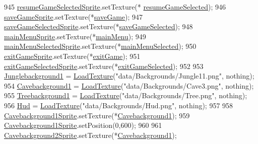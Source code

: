 \begin{DoxyCode}
945     \hyperlink{classTestApp_ab648e1b4ef3f657ca152176709c17ccc}{resumeGameSelectedSprite}.setTexture(*
      \hyperlink{classTestApp_a8caa47ef20c8711b1b89c9b82ab1202e}{resumeGameSelected});
946     \hyperlink{classTestApp_ac41e21b394f9e3e448503aa4afecf169}{saveGameSprite}.setTexture(*\hyperlink{classTestApp_ae1bdaf3470ac78c1df4907259b65c704}{saveGame});
947     \hyperlink{classTestApp_ae592b3a36dff7a6a45b669a65e5862fb}{saveGameSelectedSprite}.setTexture(*\hyperlink{classTestApp_a26f64bc9c07efe6d1be394e42a2bcc65}{saveGameSelected});
948     \hyperlink{classTestApp_a052722ceb28f1f2158513869d135057e}{mainMenuSprite}.setTexture(*\hyperlink{classTestApp_a8311b4b23d548074865fbcaed3acba40}{mainMenu});
949     \hyperlink{classTestApp_a095a03ff9f6700d21532beac758c27d3}{mainMenuSelectedSprite}.setTexture(*\hyperlink{classTestApp_ad6f809036a4aaf082211873d289b9f24}{mainMenuSelected});
950     \hyperlink{classTestApp_a55bf93b6dbf3838aacc67f652a3ff48d}{exitGameSprite}.setTexture(*\hyperlink{classTestApp_a25b19c66cacf4e14e625255dd7cd9a4a}{exitGame});
951     \hyperlink{classTestApp_a2b07fb8cf4cb37fc1da99f91fa1543ed}{exitGameSelectedSprite}.setTexture(*\hyperlink{classTestApp_af8930e73e7b870f9ea39b80a8866bc15}{exitGameSelected});
952 
953     \hyperlink{classTestApp_a3062972c2b6d27d13dd723ca051612a7}{Junglebackground1} = \hyperlink{classTestApp_a9788d85fc87f78c345907810dc56d062}{LoadTexture}(\textcolor{stringliteral}{"data/Backgrounds/Jungle11.png"}, nothing);
954     \hyperlink{classTestApp_aca476749426ccca98e07588e5888c214}{Cavebackground1} = \hyperlink{classTestApp_a9788d85fc87f78c345907810dc56d062}{LoadTexture}(\textcolor{stringliteral}{"data/Backgrounds/Cave3.png"}, nothing);
955     \hyperlink{classTestApp_a4695890302b958844789db4f9b168647}{Treebackground1} = \hyperlink{classTestApp_a9788d85fc87f78c345907810dc56d062}{LoadTexture}(\textcolor{stringliteral}{"data/Backgrounds/Tree.png"}, nothing);
956     \hyperlink{classTestApp_a269555e11bf42aab46e5e23a69473d81}{Hud} = \hyperlink{classTestApp_a9788d85fc87f78c345907810dc56d062}{LoadTexture}(\textcolor{stringliteral}{"data/Backgrounds/Hud.png"}, nothing);
957 
958     \hyperlink{classTestApp_aae6a227649f203e4941cfafd544b0b71}{Cavebackground1Sprite}.setTexture(*\hyperlink{classTestApp_aca476749426ccca98e07588e5888c214}{Cavebackground1});
959     \hyperlink{classTestApp_aae6a227649f203e4941cfafd544b0b71}{Cavebackground1Sprite}.setPosition(0,600);
960 
961     \hyperlink{classTestApp_af58194d71f83a1cd042f12f0984f3621}{Cavebackground2Sprite}.setTexture(*\hyperlink{classTestApp_aca476749426ccca98e07588e5888c214}{Cavebackground1});

\end{DoxyCode}
